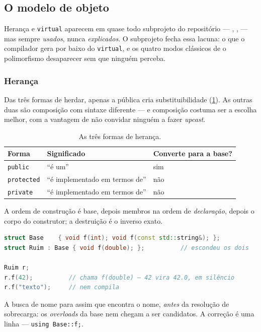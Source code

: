 \subsection{O modelo de objeto}
\label{sec:oop}

Herança e \texttt{virtual} aparecem em quase todo subprojeto do repositório ---
, ,  --- mas
sempre \emph{usados}, nunca \emph{explicados}. O subprojeto  fecha
essa lacuna: o que o compilador gera por baixo do \texttt{virtual}, e os quatro
modos clássicos de o polimorfismo desaparecer sem que ninguém perceba.

\subsubsection{Herança}

Das três formas de herdar, apenas a pública cria substituibilidade
(\cref{tab:heranca}). As outras duas são composição com sintaxe diferente --- e
composição costuma ser a escolha melhor, com a vantagem de não convidar ninguém
a fazer \emph{upcast}.

\begin{table}[htbp]
\centering
\caption{As três formas de herança.}
\label{tab:heranca}
\footnotesize
\begin{tabular}{@{}lll@{}}
\toprule
\textbf{Forma} & \textbf{Significado} & \textbf{Converte para a base?} \\
\midrule
\texttt{public}    & ``é um''                        & sim \\
\texttt{protected} & ``é implementado em termos de'' & não \\
\texttt{private}   & ``é implementado em termos de'' & não \\
\bottomrule
\end{tabular}
\end{table}

A ordem de construção é base, depois membros na ordem de \emph{declaração},
depois o corpo do construtor; a destruição é o inverso exato.

\begin{armadilha}
\begin{lstlisting}[style=bt, language=C++, frame=none,
                   xleftmargin=0pt, xrightmargin=0pt]
struct Base    { void f(int); void f(const std::string&); };
struct Ruim : Base { void f(double); };          // escondeu os dois

Ruim r;
r.f(42);          // chama f(double) — 42 vira 42.0, em silêncio
r.f("texto");     // nem compila
\end{lstlisting}
A busca de nome para assim que encontra o nome, \emph{antes} da resolução de
sobrecarga: os \emph{overloads} da base nem chegam a ser candidatos. A correção
é uma linha --- \texttt{using Base::f;}.
\end{armadilha}

